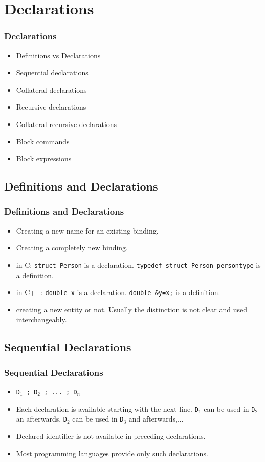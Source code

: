 \section{Declarations}
\begin{frame}
\frametitle{Declarations}
\begin{itemize}
 \item Definitions vs Declarations
 \item Sequential declarations
 \item Collateral declarations
 \item Recursive declarations
 \item Collateral recursive declarations
 \item Block commands
 \item Block expressions
\end{itemize}
\end{frame}

\subsection{Definitions and Declarations}
\begin{frame}
\frametitle{Definitions and Declarations}
\begin{itemize}
 \item {} Creating a new name for an existing binding.
 \item {} Creating a completely new binding.
 \item in C: \texttt{struct Person} is a declaration. \texttt{typedef struct Person persontype}
 is a definition.
 \item in C++: \texttt{double x} is a declaration. \texttt{double \&y=x;} is a definition.
 \item creating a new entity or not. Usually the distinction is not clear and used
 interchangeably.
\end{itemize}
\end{frame}

\subsection{Sequential Declarations}
\begin{frame}
\frametitle{Sequential Declarations}
\begin{itemize}
 \item \texttt{D$_1$ ; D$_2$ ; ... ; D$_n$}
 \item Each declaration is available starting with the next line. \texttt{D$_1$} can be used in
 \texttt{D$_2$} an afterwards,  \texttt{D$_2$} can be used in \texttt{D$_3$} and afterwards,...
 \item Declared identifier is not available in preceding declarations.
 \item Most programming languages provide only such declarations.
\end{itemize}
\end{frame}

